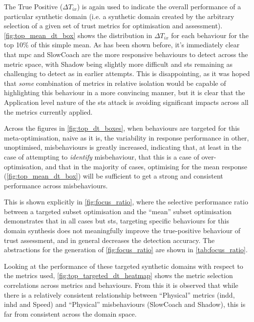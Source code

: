 The True Positive ($\Delta T_{ix}$) is again used to indicate the overall performance of a particular synthetic domain (i.e. a synthetic domain created by the arbitrary selection of a given set of trust metrics for optimisation and assessment).
\autoref{fig:top_mean_dt_box} shows the distribution in $\Delta T_{ix}$ for each behaviour for the top 10\% of this simple mean.
As has been shown before, it's immediately clear that \gls{mpc} and SlowCoach are the more responsive behaviours to detect across the metric space, with Shadow being slightly more difficult and \gls{sts} remaining as challenging to detect as in earlier attempts.
This is disappointing, as it was hoped that \emph{some} combination of metrics in relative isolation would be capable of highlighting this behaviour in a more convincing manner, but it is clear that the Application level nature of the \gls{sts} attack is avoiding significant impacts across all the metrics currently applied.

Across the figures in \autoref{fig:top_dt_boxes}, when behaviours are targeted for this meta-optimisation, naive as it is, the variability in response performance in other, unoptimised, misbehaviours is greatly increased, indicating that, at least in the case of attempting to \emph{identify} misbehaviour, that this is a case of over-optimisation, and that in the majority of cases, optimising for the mean response (\autoref{fig:top_mean_dt_box}) will be sufficient to get a strong and consistent performance across misbehaviours.

This is shown explicitly in \autoref{fig:focus_ratio}, where the selective performance ratio between a targeted subset optimisation and the ``mean'' subset optimisation demonstrates that in all cases but \gls{sts}, targeting specific behaviours for this domain synthesis does not meaningfully improve the true-positive behaviour of trust assessment, and in general decreases the detection accuracy.
The abstractions for the generation of \autoref{fig:focus_ratio} are shown in \autoref{tab:focus_ratio}.

Looking at the performance of these targeted synthetic domains with respect to the metrics used, \autoref{fig:top_targeted_dt_heatmap} shows the metric selection correlations across metrics and behaviours.
From this it is observed that while there is a relatively consistent relationship between ``Physical'' metrics (\gls{indd}, \gls{inhd} and Speed) and ``Physical'' misbehaviours (SlowCoach and Shadow), this is far from consistent across the domain space. 


